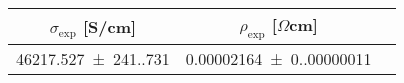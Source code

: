 \begin{tabular}{ccc}
\toprule
$\sigma_{\exp}$ [S/cm] & $\rho_{\exp}$ [$\Omega$cm] \\
\midrule
\num{46217.527(241.731)} & \num{0.00002164(0.00000011)} \\
\bottomrule
\end{tabular}

